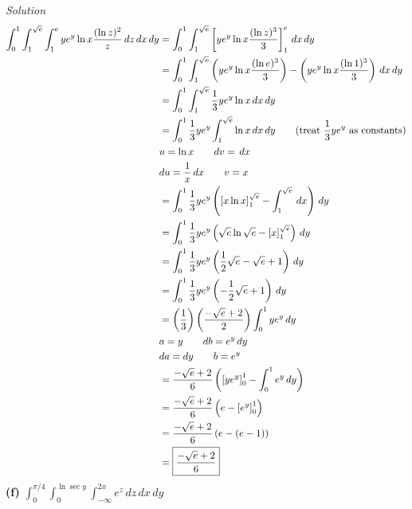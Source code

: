 \documentclass{article}
\newcommand{\lrp}[1]{\left( #1 \right)}
\newcommand{\lrb}[1]{\left[ #1 \right]}
\newcommand{\Solution}{\textit{Solution}}
\begin{document}
\Solution
\begin{align*}
    \int_0^1\int_1^{\sqrt{e}}\int_1^e ye^y\ln x\frac{(\ln z)^2}{z}\,dz\,dx\,dy&= \int_0^1\int_1^{\sqrt{e}} \lrb{ye^y\ln x \frac{(\ln z)^3}{3}}_1^e\,dx\,dy\\
    &= \int_0^1\int_1^{\sqrt{e}} \lrp{ye^y\ln x \frac{(\ln e)^3}{3}}-\lrp{ye^y\ln x\frac{(\ln 1)^3}{3}}\,dx\,dy\\
    &= \int_0^1\int_1^{\sqrt{e}}\frac{1}{3}ye^y\ln x\,dx\,dy\\
    &=\int_0^1 \frac{1}{3}ye^y\int_1^{\sqrt{e}}\ln x\,dx\,dy\tag{treat $\displaystyle\frac{1}{3}ye^y$ as constants}\\
    &u=\ln x\hspace{2em} dv= \,dx\\
    &du =\frac{1}{x}\,dx\hspace{2em} v= x\\
    &=\int_0^1 \frac{1}{3}ye^y\lrp{\lrb{x\ln x}_1^{\sqrt{e}}-\int_1^{\sqrt{e}}\,dx}\,dy\\
    &=\int_0^1\frac{1}{3}ye^y \lrp{\sqrt{e}\ln \sqrt{e}-\lrb{x}_1^{\sqrt{e}}}\,dy\\
    &=\int_0^1\frac{1}{3}ye^y\lrp{\frac{1}{2}\sqrt{e}-\sqrt{e}+1}\,dy\\
    &=\int_0^1 \frac{1}{3}ye^y \lrp{-\frac{1}{2}\sqrt{e}+1}\,dy\\
    &=\lrp{\frac{1}{3}}\lrp{\frac{-\sqrt{e}+2}{2}}\int_0^1 ye^y\,dy\\
    &a=y\hspace{2em}db=e^y\,dy\\
    &da=dy\hspace{2em}b=e^y\\
    &=\frac{-\sqrt{e}+2}{6}\lrp{\lrb{ye^y}_0^1-\int_0^1 e^y\,dy}\\
    &=\frac{-\sqrt{e}+2}{6}\lrp{e-\lrb{e^y}_0^1}\\
    &=\frac{-\sqrt{e}+2}{6}\lrp{e-\lrp{e-1}}\\
    &=\boxed{\frac{-\sqrt{e}+2}{6}}
\end{align*}
\newpage
\textbf{(f)} $\displaystyle \int_0^{\pi/4}\int_0^{\ln \sec y}\int_{-\infty}^{2x}e^z\,dz\,dx\,dy$
\end{document}
